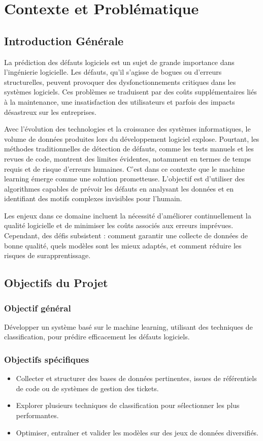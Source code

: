\chapter{Contexte et Problématique}
\label{chap:intro}

\section{Introduction Générale}
\label{sec:intro}
La prédiction des défauts logiciels est un sujet de grande importance dans l’ingénierie logicielle. Les défauts, qu’il s’agisse de bogues ou d’erreurs structurelles, peuvent provoquer des dysfonctionnements critiques dans les systèmes logiciels. Ces problèmes se traduisent par des coûts supplémentaires liés à la maintenance, une insatisfaction des utilisateurs et parfois des impacts désastreux sur les entreprises.

Avec l’évolution des technologies et la croissance des systèmes informatiques, le volume de données produites lors du développement logiciel explose. Pourtant, les méthodes traditionnelles de détection de défauts, comme les tests manuels et les revues de code, montrent des limites évidentes, notamment en termes de temps requis et de risque d’erreurs humaines. C’est dans ce contexte que le machine learning émerge comme une solution prometteuse. L’objectif est d’utiliser des algorithmes capables de prévoir les défauts en analysant les données et en identifiant des motifs complexes invisibles pour l’humain.

Les enjeux dans ce domaine incluent la nécessité d’améliorer continuellement la qualité logicielle et de minimiser les coûts associés aux erreurs imprévues. Cependant, des défis subsistent : comment garantir une collecte de données de bonne qualité, quels modèles sont les mieux adaptés, et comment réduire les risques de surapprentissage.

\section{Objectifs du Projet}
\label{sec:objectifs}
\subsection{Objectif général}
Développer un système basé sur le machine learning, utilisant des techniques de classification, pour prédire efficacement les défauts logiciels.

\subsection{Objectifs spécifiques}
\begin{itemize}
    \item Collecter et structurer des bases de données pertinentes, issues de référentiels de code ou de systèmes de gestion des tickets.
    \item Explorer plusieurs techniques de classification pour sélectionner les plus performantes.
    \item Optimiser, entraîner et valider les modèles sur des jeux de données diversifiés.
\end{itemize}

